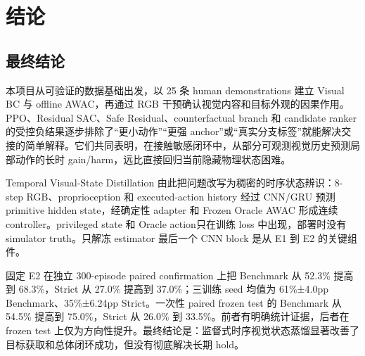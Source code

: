 \hypertarget{ux7ed3ux8bba}{%
\section{结论}\label{ux7ed3ux8bba}}

\hypertarget{ux6700ux7ec8ux7ed3ux8bba}{%
\subsection{最终结论}\label{ux6700ux7ec8ux7ed3ux8bba}}

本项目从可验证的数据基础出发，以 25 条 human demonstrations 建立 Visual BC 与 offline AWAC，再通过 RGB 干预确认视觉内容和目标外观的因果作用。PPO、Residual SAC、Safe Residual、counterfactual branch 和 candidate ranker 的受控负结果逐步排除了``更小动作''``更强 anchor''或``真实分支标签''就能解决交接的简单解释。它们共同表明，在接触敏感闭环中，从部分可观测视觉历史预测局部动作的长时 gain/harm，远比直接回归当前隐藏物理状态困难。

Temporal Visual-State Distillation 由此把问题改写为稠密的时序状态辨识：8-step RGB、proprioception 和 executed-action history 经过 CNN/GRU 预测 primitive hidden state，经确定性 adapter 和 Frozen Oracle AWAC 形成连续 controller。privileged state 和 Oracle action只在训练 loss 中出现，部署时没有 simulator truth。只解冻 estimator 最后一个 CNN block 是从 E1 到 E2 的关键组件。

固定 E2 在独立 300-episode paired confirmation 上把 Benchmark 从 52.3\% 提高到 68.3\%，Strict 从 27.0\% 提高到 37.0\%；三训练 seed 均值为 61\%±4.0pp Benchmark、35\%±6.24pp Strict。一次性 paired frozen test 的 Benchmark 从 54.5\% 提高到 75.0\%，Strict 从 26.0\% 到 33.5\%。前者有明确统计证据，后者在 frozen test 上仅为方向性提升。最终结论是：监督式时序视觉状态蒸馏显著改善了目标获取和总体闭环成功，但没有彻底解决长期 hold。
